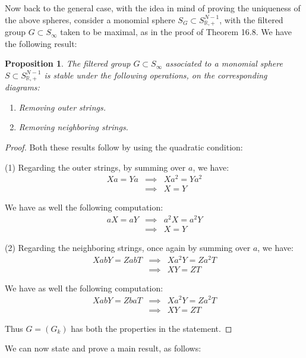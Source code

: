 \documentclass[12pt]{amsbook}
\newtheorem{proposition}[theorem]{Proposition}
\begin{document}
Now back to the general case, with the idea in mind of proving the uniqueness of the above spheres, consider a monomial sphere $S_G\subset S^{N-1}_{\mathbb R,+}$, with the filtered group $G\subset S_\infty$ taken to be maximal, as in the proof of Theorem 16.8. We have the following result:

\begin{proposition}
The filtered group $G\subset S_\infty$ associated to a monomial sphere $S\subset S^{N-1}_{\mathbb R,+}$ is stable under the following operations, on the corresponding diagrams:
\begin{enumerate}
\item Removing outer strings.

\item Removing neighboring strings.
\end{enumerate}
\end{proposition}

\begin{proof}
Both these results follow by using the quadratic condition:

\medskip

(1) Regarding the outer strings, by summing over $a$, we have:
\begin{eqnarray*}
Xa=Ya
&\implies&Xa^2=Ya^2\\
&\implies&X=Y
\end{eqnarray*}

We have as well the following computation:
\begin{eqnarray*}
aX=aY
&\implies&a^2X=a^2Y\\
&\implies&X=Y
\end{eqnarray*}

(2) Regarding the neighboring strings, once again by summing over $a$, we have:
\begin{eqnarray*}
XabY=ZabT
&\implies&Xa^2Y=Za^2T\\
&\implies&XY=ZT
\end{eqnarray*}

We have as well the following computation:
\begin{eqnarray*}
XabY=ZbaT
&\implies&Xa^2Y=Za^2T\\
&\implies&XY=ZT
\end{eqnarray*}

Thus $G=(G_k)$ has both the properties in the statement.
\end{proof}

We can now state and prove a main result, as follows:
\end{document}
